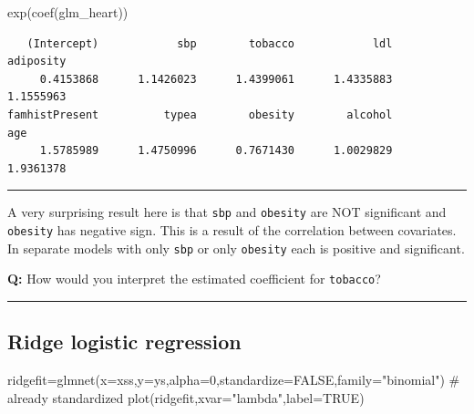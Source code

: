 \documentclass[
  letterpaper,
  DIV=11,
  numbers=noendperiod]{scrartcl}
\newenvironment{Shaded}{\begin{snugshade}}{\end{snugshade}}
\newcommand{\AttributeTok}[1]{\textcolor[rgb]{0.40,0.45,0.13}{#1}}
\newcommand{\CommentTok}[1]{\textcolor[rgb]{0.37,0.37,0.37}{#1}}
\newcommand{\ConstantTok}[1]{\textcolor[rgb]{0.56,0.35,0.01}{#1}}
\newcommand{\DecValTok}[1]{\textcolor[rgb]{0.68,0.00,0.00}{#1}}
\newcommand{\FunctionTok}[1]{\textcolor[rgb]{0.28,0.35,0.67}{#1}}
\newcommand{\NormalTok}[1]{\textcolor[rgb]{0.00,0.23,0.31}{#1}}
\newcommand{\OtherTok}[1]{\textcolor[rgb]{0.00,0.23,0.31}{#1}}
\newcommand{\StringTok}[1]{\textcolor[rgb]{0.13,0.47,0.30}{#1}}
\begin{document}
\begin{Shaded}
\begin{Highlighting}[]
\FunctionTok{exp}\NormalTok{(}\FunctionTok{coef}\NormalTok{(glm\_heart))}
\end{Highlighting}
\end{Shaded}

\begin{verbatim}
   (Intercept)            sbp        tobacco            ldl      adiposity 
     0.4153868      1.1426023      1.4399061      1.4335883      1.1555963 
famhistPresent          typea        obesity        alcohol            age 
     1.5785989      1.4750996      0.7671430      1.0029829      1.9361378 
\end{verbatim}

\begin{center}\rule{0.5\linewidth}{0.5pt}\end{center}

A very surprising result here is that \texttt{sbp} and \texttt{obesity}
are NOT significant and \texttt{obesity} has negative sign. This is a
result of the correlation between covariates. In separate models with
only \texttt{sbp} or only \texttt{obesity} each is positive and
significant.

\textbf{Q:} How would you interpret the estimated coefficient for
\texttt{tobacco}?

\begin{center}\rule{0.5\linewidth}{0.5pt}\end{center}

\hypertarget{ridge-logistic-regression}{%
\subsection{Ridge logistic regression}\label{ridge-logistic-regression}}

\begin{Shaded}
\begin{Highlighting}[]
\NormalTok{ridgefit}\OtherTok{=}\FunctionTok{glmnet}\NormalTok{(}\AttributeTok{x=}\NormalTok{xss,}\AttributeTok{y=}\NormalTok{ys,}\AttributeTok{alpha=}\DecValTok{0}\NormalTok{,}\AttributeTok{standardize=}\ConstantTok{FALSE}\NormalTok{,}\AttributeTok{family=}\StringTok{"binomial"}\NormalTok{) }\CommentTok{\# already standardized}
\FunctionTok{plot}\NormalTok{(ridgefit,}\AttributeTok{xvar=}\StringTok{"lambda"}\NormalTok{,}\AttributeTok{label=}\ConstantTok{TRUE}\NormalTok{)}
\end{Highlighting}
\end{Shaded}
\end{document}
